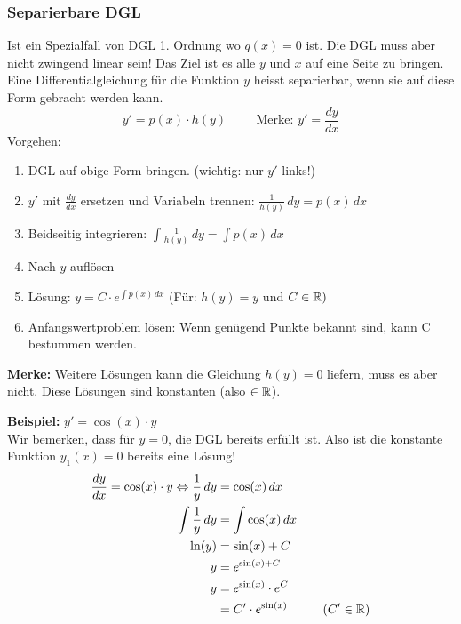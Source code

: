 \subsubsection{Separierbare DGL}
Ist ein Spezialfall von DGL 1. Ordnung wo $q(x) = 0$ ist. Die DGL muss aber nicht zwingend linear sein! Das Ziel ist es alle $y$ und $x$ auf eine Seite zu bringen.
Eine Differentialgleichung für die Funktion $y$ heisst separierbar, wenn sie auf diese Form gebracht werden kann.
\[
	y' = p(x) \cdot h(y) \hspace{1cm} \text{Merke: $y' = \frac{dy}{dx}$}
\]
Vorgehen:
\begin{enumerate}
	\item DGL auf obige Form bringen. (wichtig: nur $y'$ links!)

	\item $y'$ mit $\frac{dy}{dx}$ ersetzen und Variabeln trennen: $\frac{1}{h(y)} \, dy = p(x) \, dx$

	\item Beidseitig integrieren: $\int \frac{1}{h(y)} \, dy = \int p(x) \, dx$

	\item Nach $y$ auflösen

	\item Lösung: $y = C \cdot e^{\int p(x) \, dx}$ \hspace{0.5cm} (Für: $h(y) = y$ und $C \in \mathbb{R})$

	\item Anfangswertproblem lösen: Wenn genügend Punkte bekannt sind, kann C bestummen werden.
\end{enumerate}
\textbf{Merke:} Weitere Lösungen kann die Gleichung $h(y) = 0$ liefern, muss es aber nicht. Diese Lösungen sind konstanten (also $\in \mathbb{R}$).

\textbf{Beispiel:} $y' = \cos(x) \cdot y$ \\
{\small Wir bemerken, dass für $y = 0$, die DGL bereits erfüllt ist. Also ist die konstante Funktion $y_1(x) = 0$ bereits eine Lösung!}
\begin{align*}
	\frac{dy}{dx} = \cos(x) \cdot y \Leftrightarrow \frac{1}{y} \, dy &= \cos(x) \, dx\\
	\int \frac{1}{y} \, dy &= \int \cos(x) \, dx \\
	\ln(y) &= \sin(x) + C\\
	y &= e^{\sin(x) + C} \\
	y &= e^{\sin(x)} \cdot e^C \\
	 &= C' \cdot e^{\sin(x)}	\hspace{1cm} (C' \in \mathbb{R})
\end{align*}


